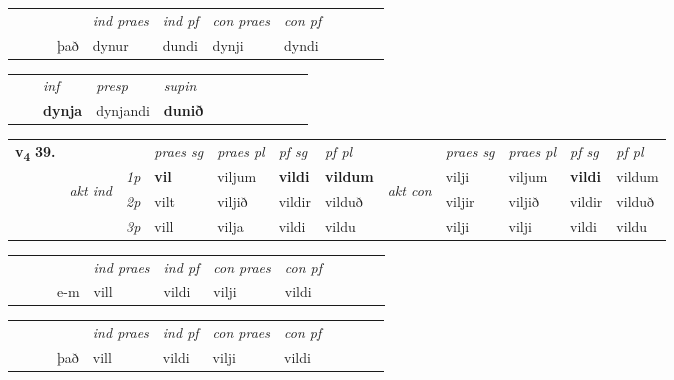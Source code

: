 \begin{tabular}{llllllllllll}
 & &  & &  \textit{ind praes} & \textit{ind pf} & \textit{con praes} & \textit{con pf} \\*
&  & & það & dynur & dundi & dynji & dyndi \\*
\cmidrule{5-9}
\end{tabular}


\begin{tabular}{llllllllllll}
 & & \textit{inf}     & \textit{presp} & \textit{supin}       \\*
  & & \textbf{dynja}      & dynjandi &  \textbf{dunið}   \\*
\cmidrule{1-12}
\end{tabular}



\begin{tabular}{llllllllllll} \toprule
\multirow{4}{*}{{{\textbf{v{\textsubscript{4}}} \Large{\textbf{39.}}}}}  & &   &  \textit{praes sg}  & \textit{praes pl}  &\textit{ pf sg} & \textit{pf pl} &  &  \textit{praes sg}  & \textit{praes pl}  & \textit{pf sg} & \textit{pf pl } \\*
	\cmidrule{4-7} \cmidrule{9-12}
 & \multirow{3}{*}{\begin{turn}{90}\textit{akt ind}\end{turn}} & {\textit{1p}} & \textbf{vil} & viljum    & \textbf{vildi} & \textbf{vildum} & \multirow{3}{*}{\begin{turn}{90}\textit{akt con}\end{turn}} &vilji & viljum & \textbf{vildi} & vildum\\*
& &  {\textit{2p}} &  vilt  & viljið   & vildir & vilduð & & viljir & viljið & vildir & vilduð \\*
& &  {\textit{3p}} & vill & vilja   & vildi & vildu & & vilji & vilji& vildi & vildu  \\*
\cmidrule{4-7} \cmidrule{9-12}
\end{tabular}


\begin{tabular}{llllllllllll}
 & &  & &  \textit{ind praes} & \textit{ind pf} & \textit{con praes} & \textit{con pf} \\*
&  & & e-m & vill & vildi & vilji & vildi \\*
\cmidrule{5-9}
\end{tabular}


\begin{tabular}{llllllllllll}
 & &  & &  \textit{ind praes} & \textit{ind pf} & \textit{con praes} & \textit{con pf} \\*
&  & & það & vill & vildi & vilji & vildi \\*
\cmidrule{5-9}
\end{tabular}


